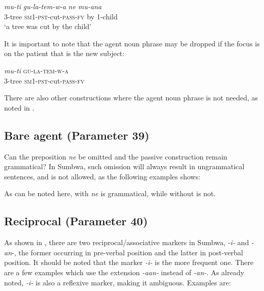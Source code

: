 \documentclass[output=paper		  ]{langscibook}
\begin{document}
    \ex\label{ex:kahigi:52b} \gll \textit{mu-ti}     \textit{gu-la-tem-w-a}         \textit{ne}   \textit{mu-ana}\\
    3-tree   \textsc{sm1-pst-}cut\textsc{-pass-fv}  by   1-child \\
    \glt ‘a tree was cut by the child’
    \z
\z

{It is important to note that the agent noun phrase may be dropped if the focus is on the patient that is the new subject:}

\ea\label{ex:kahigi:53} \gll \textit{mu-ti}     \textsc{gu-la-tem-w-a}\\
 3-tree   \textsc{sm1-pst-}cut\textsc{-pass-fv} \\
\z

{There are also other constructions where the agent noun phrase is not needed, as noted in .}

\subsection{Bare agent (Parameter 39)}\label{sec:kahigi:4.4}

{Can the preposition} {\textit{ne} }{be omitted and the passive construction remain grammatical? In Sumbwa, such omission will always result in ungrammatical sentences, and is not allowed, as the following examples shows:}

\ea\label{ex:kahigi:54}
\label{ex:kahigi:54a}

 \label{ex:kahigi:54b}
    \z
\z

{As can be noted here,  with} {\textit{ne}} {is grammatical, while  without is not.}

\subsection{Reciprocal (Parameter 40)}\label{sec:kahigi:4.5}

{As shown in , there are two reciprocal/associative markers in Sumbwa,} {\textit{{}-i-}} {and} {\textit{{}-an}}{{}-, the former occurring in pre-verbal position and the latter in post-verbal position. It should be noted that the marker} {\textit{{}-i-}} {is the more frequent one. There are a few examples which use the extension} {\textit{{}-aan-} }{instead of} {\textit{{}-an-}}{. As already noted,} {\textit{{}-i-}} {is also a reflexive marker, making it ambiguous. Examples are:}
\end{document}

